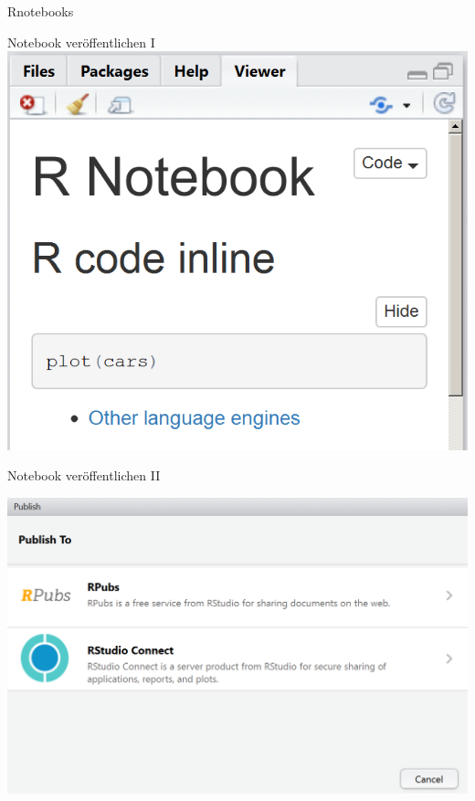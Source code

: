 \documentclass[ignorenonframetext,]{beamer}
\begin{document}
\begin{frame}[fragile]{Rnotebooks}
\begin{block}{Notebook veröffentlichen I}
\includegraphics{./tex2pdf.9796/5b1dbc0c68b69060d1ae94848af5547ad7c4a4fb.png}

\end{block}

\begin{block}{Notebook veröffentlichen II}

\includegraphics{./tex2pdf.9796/28365916615ed13366e94545603bcd4b86271ee9.png}

\end{block}

\end{frame}
\end{document}
